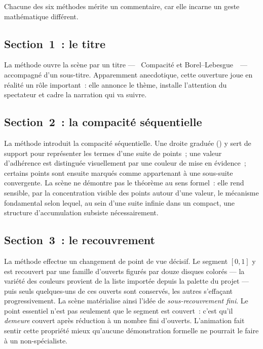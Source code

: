 \documentclass[12pt, a4paper, openany]{report}
\begin{document}
	Chacune des six méthodes mérite un commentaire, car elle incarne un geste mathématique différent.

	\subsection{Section~1~: le titre}

	La méthode  ouvre la scène par un titre — \og~Compacité et Borel--Lebesgue~\fg\ — accompagné d’un sous-titre. Apparemment anecdotique, cette ouverture joue en réalité un rôle important~: elle annonce le thème, installe l’attention du spectateur et cadre la narration qui va suivre.

	\subsection{Section~2~: la compacité séquentielle}

	La méthode  introduit la compacité séquentielle. Une droite graduée () y sert de support pour représenter les termes d’une suite de points~; une valeur d’adhérence est distinguée visuellement par une couleur de mise en évidence~; certains points sont ensuite marqués comme appartenant à une sous-suite convergente. La scène ne démontre pas le théorème au sens formel~: elle rend sensible, par la concentration visible des points autour d’une valeur, le mécanisme fondamental selon lequel, au sein d’une suite infinie dans un compact, une structure d’accumulation subsiste nécessairement.

	\subsection{Section~3~: le recouvrement}

	La méthode  effectue un changement de point de vue décisif. Le segment $[0,1]$ y est recouvert par une famille d’ouverts figurés par douze disques colorés — la variété des couleurs provient de la liste  importée depuis la palette du projet — puis seuls quelques-uns de ces ouverts sont conservés, les autres s’effaçant progressivement. La scène matérialise ainsi l’idée de \emph{sous-recouvrement fini}. Le point essentiel n’est pas seulement que le segment est couvert~: c’est qu’il \emph{demeure} couvert après réduction à un nombre fini d’ouverts. L’animation fait sentir cette propriété mieux qu’aucune démonstration formelle ne pourrait le faire à un non-spécialiste.
\end{document}

